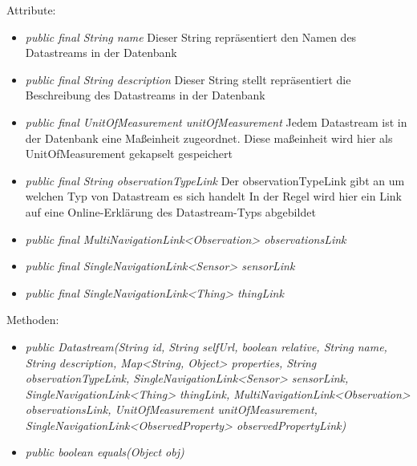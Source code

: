 Attribute:
\begin{itemize}
    \item \emph{public final String name} Dieser String repräsentiert den Namen des Datastreams in der Datenbank
    \item \emph{public final String description} Dieser String stellt repräsentiert die Beschreibung des Datastreams in der Datenbank
    \item \emph{public final UnitOfMeasurement unitOfMeasurement} Jedem Datastream ist in der Datenbank eine Maßeinheit zugeordnet. Diese maßeinheit wird hier als UnitOfMeasurement gekapselt gespeichert
    \item \emph{public final String observationTypeLink} Der observationTypeLink gibt an um welchen Typ von Datastream es sich handelt
    In der Regel wird hier ein Link auf eine Online-Erklärung des Datastream-Typs abgebildet
    \item \emph{public final MultiNavigationLink<Observation> observationsLink} 
    \item \emph{public final SingleNavigationLink<Sensor> sensorLink} 
    \item \emph{public final SingleNavigationLink<Thing> thingLink} 
\end{itemize}
Methoden: \begin{itemize}
    \item \emph{public Datastream(String id, String selfUrl, boolean relative, String name, String description, Map<String, Object> properties, String observationTypeLink, SingleNavigationLink<Sensor> sensorLink, SingleNavigationLink<Thing> thingLink, MultiNavigationLink<Observation> observationsLink, UnitOfMeasurement unitOfMeasurement, SingleNavigationLink<ObservedProperty> observedPropertyLink)}
    \item \emph{public boolean equals(Object obj)} 
\end{itemize}

